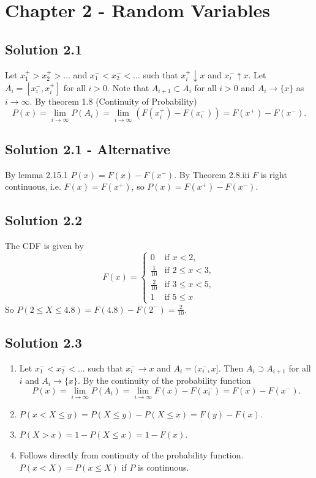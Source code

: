 \section*{Chapter 2 - Random Variables}

\subsection*{Solution 2.1}

Let $x^+_1 > x^+_2 > ...$ and $x^-_1 < x^-_2 < ...$ such that $x^+_i \downarrow x$ and $x^-_i \uparrow x$.
Let $A_i = [x^-_i, x^+_i]$ for all $i > 0$.
Note that $A_{i+1} \subset A_i$ for all $i > 0$ and $A_i \to \{x\}$ as $i \to \infty$.
By theorem 1.8 (Continuity of Probability)
$$
P(x) = \lim_{i \to \infty} P(A_i) = \lim_{i \to \infty} (F(x^+_i) - F(x^-_i)) = F(x^+) - F(x^-).
$$

\subsection*{Solution 2.1 - Alternative}

By lemma 2.15.1 $P(x) = F(x) - F(x^-)$.
By Theorem 2.8.iii $F$ is right continuous, i.e. $F(x) = F(x^+)$, so $P(x) = F(x^+) - F(x^-)$.


\subsection*{Solution 2.2}

The CDF is given by
$$
F(x) = \left\{ \begin{array}{ll}
    0 & \text{if } x < 2, \\
    \frac{1}{10} & \text{if } 2 \leq x < 3, \\
    \frac{2}{10} & \text{if } 3 \leq x < 5, \\
    1 & \text{if } 5 \leq x
\end{array} \right.
$$
So $P(2 \leq X \leq 4.8) = F(4.8) - F(2^-) = \frac{2}{10}$.


\subsection*{Solution 2.3}

\begin{enumerate}
\item Let $x^-_1 < x^-_2 < ...$ such that $x^-_i \to x$ and $A_i = (x^-_i, x]$.
Then $A_i \supset A_{i+1}$ for all $i$ and $A_i \to \{x\}$.
By the continuity of the probability function
$$
P(x) = \lim_{i \to \infty} P(A_i) = \lim_{i \to \infty} F(x) - F(x^-_i) = F(x) - F(x^-).
$$
\item $P(x < X \leq y) = P(X \leq y) - P(X \leq x) = F(y) - F(x)$.
\item $P(X > x) = 1 - P(X \leq x) = 1 - F(x)$.
\item Follows directly from continuity of the probability function.
$P(x < X) = P(x \leq X)$ if $P$ is continuous.
\end{enumerate}


